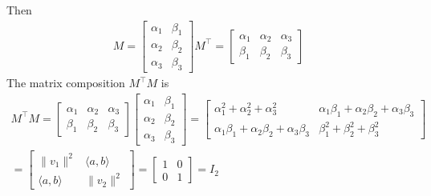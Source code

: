 \documentclass[11pt,reqno,a4paper]{amsart}
\begin{document}
Then
\begin{align*}
    M =
    \begin{bmatrix}
        \alpha_1 & \beta_1\\
        \alpha_2 & \beta_2\\
        \alpha_3 & \beta_3
    \end{bmatrix}
    M^\intercal =
    \begin{bmatrix}
        \alpha_1 & \alpha_2 & \alpha_3\\
        \beta_1 & \beta_2 & \beta_3
    \end{bmatrix}
\end{align*}
The matrix composition $M^\intercal M$ is
\begin{align*}
    M^\intercal M = 
    \begin{bmatrix}
        \alpha_1 & \alpha_2 & \alpha_3\\
        \beta_1 & \beta_2 & \beta_3
    \end{bmatrix}
    \begin{bmatrix}
        \alpha_1 & \beta_1\\
        \alpha_2 & \beta_2\\
        \alpha_3 & \beta_3
    \end{bmatrix}
    =
    \begin{bmatrix}
        \alpha_1^2 + \alpha_2^2 + \alpha_3^2 & \alpha_1 \beta_1 + \alpha_2 \beta_2 + \alpha_3 \beta_3\\
        \alpha_1 \beta_1 + \alpha_2 \beta_2 + \alpha_3 \beta_3 & \beta_1^2 + \beta_2^2 + \beta_3^2
    \end{bmatrix}
    \\
    =
    \begin{bmatrix}
        \lVert v_1 \rVert^2 & \langle a, b \rangle\\
        \langle a, b \rangle & \lVert v_2 \rVert^2
    \end{bmatrix}
    =
    \begin{bmatrix}
        1 & 0\\
        0 & 1
    \end{bmatrix}
    =
    I_2
\end{align*}
\end{document}

